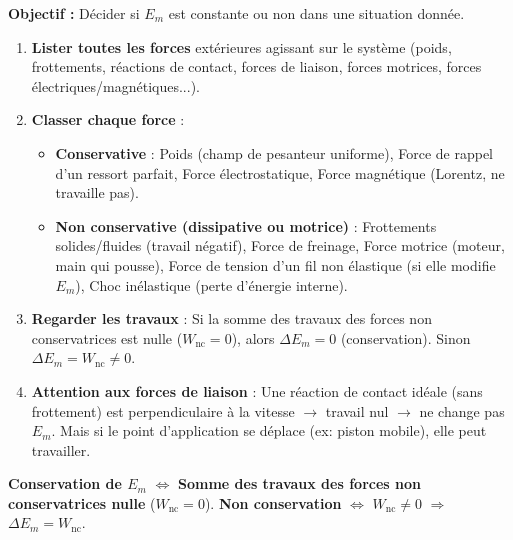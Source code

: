 \documentclass[11pt]{article}
\begin{document}
\begin{methode}
    \textbf{Objectif :} Décider si $E_m$ est constante ou non dans une situation donnée.
    \begin{enumerate}
        \item \textbf{Lister toutes les forces} extérieures agissant sur le système (poids, frottements, réactions de contact, forces de liaison, forces motrices, forces électriques/magnétiques...).
        \item \textbf{Classer chaque force} :
            \begin{itemize}
                \item \textbf{Conservative} : Poids (champ de pesanteur uniforme), Force de rappel d'un ressort parfait, Force électrostatique, Force magnétique (Lorentz, ne travaille pas).
                \item \textbf{Non conservative (dissipative ou motrice)} : Frottements solides/fluides (travail négatif), Force de freinage, Force motrice (moteur, main qui pousse), Force de tension d'un fil non élastique (si elle modifie $E_m$), Choc inélastique (perte d'énergie interne).
            \end{itemize}
        \item \textbf{Regarder les travaux} : Si la somme des travaux des forces non conservatrices est nulle ($W_{\text{nc}} = 0$), alors $\Delta E_m = 0$ (conservation). Sinon $\Delta E_m = W_{\text{nc}} \neq 0$.
        \item \textbf{Attention aux forces de liaison} : Une réaction de contact idéale (sans frottement) est perpendiculaire à la vitesse $\rightarrow$ travail nul $\rightarrow$ ne change pas $E_m$. Mais si le point d'application se déplace (ex: piston mobile), elle peut travailler.
    \end{enumerate}
    \begin{aretenir}[Critère]
        \textbf{Conservation de $E_m$} $\Leftrightarrow$ \textbf{Somme des travaux des forces non conservatrices nulle} ($W_{\text{nc}} = 0$).
        \textbf{Non conservation} $\Leftrightarrow$ $W_{\text{nc}} \neq 0$ $\Rightarrow$ $\Delta E_m = W_{\text{nc}}$.
    \end{aretenir}
\end{methode}
\end{document}
